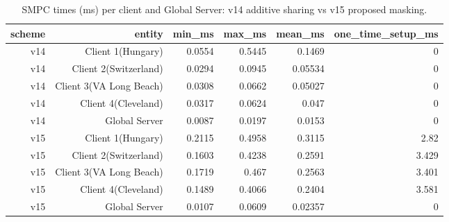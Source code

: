 \begin{table}[t]
\centering
\small
\caption{SMPC times (ms) per client and Global Server: v14 additive sharing vs v15 proposed masking.}
\label{tab:smpc_times}
\begin{tabular}{rrrrrr}
\toprule
scheme & entity & min\_ms & max\_ms & mean\_ms & one\_time\_setup\_ms \\
\midrule
v14 & Client 1(Hungary) & 0.0554 & 0.5445 & 0.1469 & 0 \\
v14 & Client 2(Switzerland) & 0.0294 & 0.0945 & 0.05534 & 0 \\
v14 & Client 3(VA Long Beach) & 0.0308 & 0.0662 & 0.05027 & 0 \\
v14 & Client 4(Cleveland) & 0.0317 & 0.0624 & 0.047 & 0 \\
v14 & Global Server & 0.0087 & 0.0197 & 0.0153 & 0 \\
v15 & Client 1(Hungary) & 0.2115 & 0.4958 & 0.3115 & 2.82 \\
v15 & Client 2(Switzerland) & 0.1603 & 0.4238 & 0.2591 & 3.429 \\
v15 & Client 3(VA Long Beach) & 0.1719 & 0.467 & 0.2563 & 3.401 \\
v15 & Client 4(Cleveland) & 0.1489 & 0.4066 & 0.2404 & 3.581 \\
v15 & Global Server & 0.0107 & 0.0609 & 0.02357 & 0 \\
\bottomrule
\end{tabular}
\end{table}
